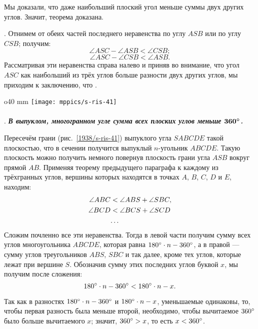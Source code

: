 Мы доказали, что даже наибольший плоский угол меньше суммы двух других углов.
Значит, теорема доказана.

\medskip

.
Отнимем от обеих частей последнего неравенства по углу $ASB$ или по углу $CSB$;
получим:
\[\angle ASC - \angle ASB < \angle CSB;\]
\[\angle ASC - \angle CSB < \angle ASB.\]
Рассматривая эти неравенства справа налево и приняв во внимание, что угол $ASC$ как наибольший из трёх углов больше разности двух других углов, мы приходим к заключению, что .

\begin{wrapfigure}[9]{o}{40 mm}
\vskip-8mm
\centering
\texttt{[image: mppics/s-ris-41]}
\caption{}\label{1938/s-ris-41}
\end{wrapfigure}

\paragraph{}\label{1938/s51}
\mbox{.}
\textbf{\emph{В выпуклом, многогранном угле сумма всех плоских углов меньше $\bm{360\degree}$.}}

Пересечём грани (рис.~\ref{1938/s-ris-41}) выпуклого угла $SABCDE$ такой плоскостью, что в сечении получится выпуклый $n$-угольник $ABCDE$.
Такую плоскость можно получить немного повернув плоскость грани угла $ASB$ вокруг прямой $AB$.
Применяя теорему предыдущего параграфа к каждому из трёхгранных углов, вершины которых находятся в точках $A$, $B$, $C$, $D$ и $E$, находим:
\begin{align*}
\angle ABC &< \angle ABS + \angle SBC,
\\
\angle BCD &< \angle BCS + \angle SCD
\\
&\text{\dots}
\end{align*}
Сложим почленно все эти неравенства.
Тогда в левой части получим сумму всех углов многоугольника $ABCDE$, которая равна $180\degree\cdot n \z- 360\degree$, а в правой — сумму углов треугольников $ABS$, $SBC$ и так далее, кроме тех углов, которые лежат при вершине $S$.
Обозначив сумму этих последних углов буквой $x$, мы получим после сложения:
\[180\degree\cdot n - 360\degree< 180\degree\cdot n - x.\]

Так как в разностях $180\degree\cdot n-360\degree$ и $180\degree\cdot n-x$, уменьшаемые одинаковы, то, чтобы первая разность была меньше второй, необходимо, чтобы вычитаемое $360\degree$ было больше вычитаемого $x$;
значит, $360\degree> x$, то есть $x < 360\degree$.

